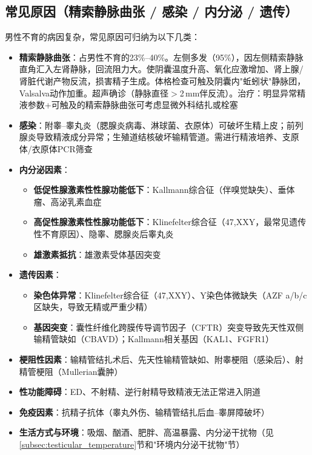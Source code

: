 \subsection{常见原因（精索静脉曲张 / 感染 / 内分泌 / 遗传）}

男性不育的病因复杂，常见原因可归纳为以下几类：

\begin{itemize}[leftmargin=2cm]
	\item \textbf{精索静脉曲张}：占男性不育的23\%--40\%。左侧多发（95\%），因左侧精索静脉直角汇入左肾静脉，回流阻力大。使阴囊温度升高、氧化应激增加、肾上腺/肾脏代谢产物反流，损害精子生成。体格检查可触及阴囊内"蚯蚓状"静脉团，Valsalva动作加重。超声确诊（静脉直径$>$2\,mm伴反流）。治疗：明显异常精液参数+可触及的精索静脉曲张可考虑显微外科结扎或栓塞
	\item \textbf{感染}：附睾--睾丸炎（腮腺炎病毒、淋球菌、衣原体）可破坏生精上皮；前列腺炎导致精液成分异常；生殖道结核破坏输精管道。需进行精液培养、支原体/衣原体PCR筛查
	\item \textbf{内分泌因素}：
    \begin{itemize}
    	\item \textbf{低促性腺激素性性腺功能低下}：Kallmann综合征（伴嗅觉缺失）、垂体瘤、高泌乳素血症
    	\item \textbf{高促性腺激素性性腺功能低下}：Klinefelter综合征（47,XXY，最常见遗传性不育原因）、隐睾、腮腺炎后睾丸炎
    	\item \textbf{雄激素抵抗}：雄激素受体基因突变
    \end{itemize}
	\item \textbf{遗传因素}：
    \begin{itemize}
    	\item \textbf{染色体异常}：Klinefelter综合征（47,XXY）、Y染色体微缺失（AZF a/b/c区缺失，导致无精或严重少精）
    	\item \textbf{基因突变}：囊性纤维化跨膜传导调节因子（CFTR）突变导致先天性双侧输精管缺如（CBAVD）；Kallmann相关基因（KAL1、FGFR1）
    \end{itemize}
	\item \textbf{梗阻性因素}：输精管结扎术后、先天性输精管缺如、附睾梗阻（感染后）、射精管梗阻（Mullerian囊肿）
	\item \textbf{性功能障碍}：ED、不射精、逆行射精导致精液无法正常进入阴道
	\item \textbf{免疫因素}：抗精子抗体（睾丸外伤、输精管结扎后血--睾屏障破坏）
	\item \textbf{生活方式与环境}：吸烟、酗酒、肥胖、高温暴露、内分泌干扰物（见\ref{subsec:testicular_temperature}节和"环境内分泌干扰物"节）
\end{itemize}

